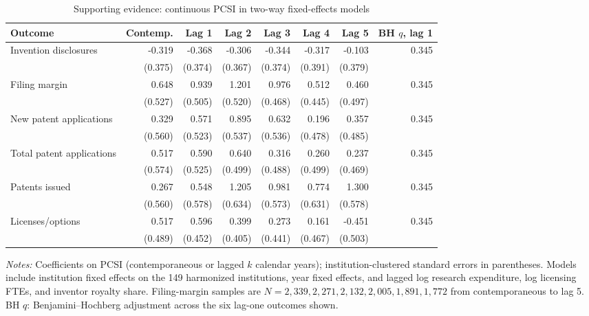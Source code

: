 \begin{table}[htbp]\centering
\caption{Supporting evidence: continuous PCSI in two-way fixed-effects models}\label{tab:twfe}
\begin{threeparttable}\footnotesize\setlength{\tabcolsep}{3pt}\begin{tabular}{lrrrrrrr}\toprule
Outcome & Contemp. & Lag 1 & Lag 2 & Lag 3 & Lag 4 & Lag 5 & BH $q$, lag 1 \\\midrule
Invention disclosures & -0.319 & -0.368 & -0.306 & -0.344 & -0.317 & -0.103 & 0.345 \\
 & (0.375) & (0.374) & (0.367) & (0.374) & (0.391) & (0.379) & \\
Filing margin & 0.648 & 0.939 & 1.201 & 0.976 & 0.512 & 0.460 & 0.345 \\
 & (0.527) & (0.505) & (0.520) & (0.468) & (0.445) & (0.497) & \\
New patent applications & 0.329 & 0.571 & 0.895 & 0.632 & 0.196 & 0.357 & 0.345 \\
 & (0.560) & (0.523) & (0.537) & (0.536) & (0.478) & (0.485) & \\
Total patent applications & 0.517 & 0.590 & 0.640 & 0.316 & 0.260 & 0.237 & 0.345 \\
 & (0.574) & (0.525) & (0.499) & (0.488) & (0.499) & (0.469) & \\
Patents issued & 0.267 & 0.548 & 1.205 & 0.981 & 0.774 & 1.300 & 0.345 \\
 & (0.560) & (0.578) & (0.634) & (0.573) & (0.631) & (0.578) & \\
Licenses/options & 0.517 & 0.596 & 0.399 & 0.273 & 0.161 & -0.451 & 0.345 \\
 & (0.489) & (0.452) & (0.405) & (0.441) & (0.467) & (0.503) & \\
\bottomrule\end{tabular}
\begin{tablenotes}[flushleft]\footnotesize
\item \textit{Notes:} Coefficients on PCSI (contemporaneous or lagged $k$ calendar years); institution-clustered standard errors in parentheses. Models include institution fixed effects on the 149 harmonized institutions, year fixed effects, and lagged log research expenditure, log licensing FTEs, and inventor royalty share. Filing-margin samples are $N=2,339, 2,271, 2,132, 2,005, 1,891, 1,772$ from contemporaneous to lag 5. BH $q$: Benjamini--Hochberg adjustment across the six lag-one outcomes shown.
\end{tablenotes}\end{threeparttable}\end{table}

